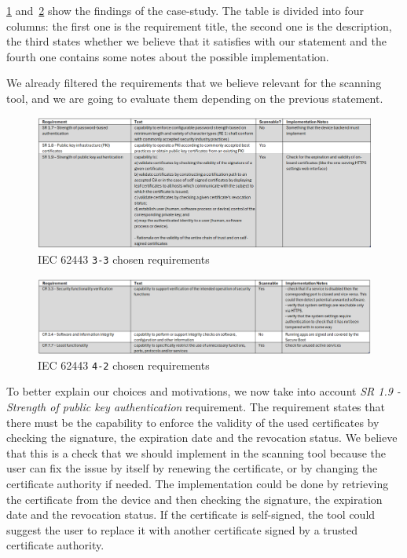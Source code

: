 \cref{fig:iec62443-findings-3_3} and~\cref{fig:iec62443-findings-4_2} show the findings of the case-study. The table is divided into four columns: the first one is the requirement title, the second one is the description, the third states whether we believe that it satisfies with our statement and the fourth one contains some notes about the possible implementation.

We already filtered the requirements that we believe relevant for the scanning tool, and we are going to evaluate them depending on the previous statement.

\begin{figure}[ht]
  \centering
  \includegraphics[width=1.0\textwidth]{chapters/04/assets/iec62443-findings-3_3}
  \caption{IEC 62443 \texttt{3-3} chosen requirements}
  \label{fig:iec62443-findings-3_3}
\end{figure}

\begin{figure}[ht]
  \centering
  \includegraphics[width=1.0\textwidth]{chapters/04/assets/iec62443-findings-4_2}
  \caption{IEC 62443 \texttt{4-2} chosen requirements}
  \label{fig:iec62443-findings-4_2}
\end{figure}

To better explain our choices and motivations, we now take into account \textit{SR 1.9 - Strength of public key authentication} requirement. The requirement states that there must be the capability to enforce the validity of the used certificates by checking the signature, the expiration date and the revocation status. We believe that this is a check that we should implement in the scanning tool because the user can fix the issue by itself by renewing the certificate, or by changing the certificate authority if needed. The implementation could be done by retrieving the certificate from the device and then checking the signature, the expiration date and the revocation status. If the certificate is self-signed, the tool could suggest the user to replace it with another certificate signed by a trusted certificate authority.

